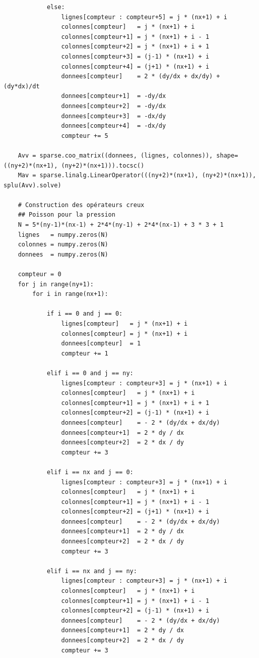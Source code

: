 \begin{verbatim}
            else:
                lignes[compteur : compteur+5] = j * (nx+1) + i
                colonnes[compteur]   = j * (nx+1) + i
                colonnes[compteur+1] = j * (nx+1) + i - 1
                colonnes[compteur+2] = j * (nx+1) + i + 1
                colonnes[compteur+3] = (j-1) * (nx+1) + i
                colonnes[compteur+4] = (j+1) * (nx+1) + i
                donnees[compteur]    = 2 * (dy/dx + dx/dy) + (dy*dx)/dt
                donnees[compteur+1]  = -dy/dx
                donnees[compteur+2]  = -dy/dx
                donnees[compteur+3]  = -dx/dy
                donnees[compteur+4]  = -dx/dy
                compteur += 5

    Avv = sparse.coo_matrix((donnees, (lignes, colonnes)), shape=((ny+2)*(nx+1), (ny+2)*(nx+1))).tocsc()
    Mav = sparse.linalg.LinearOperator(((ny+2)*(nx+1), (ny+2)*(nx+1)), splu(Avv).solve)
    
    # Construction des opérateurs creux
    ## Poisson pour la pression
    N = 5*(ny-1)*(nx-1) + 2*4*(ny-1) + 2*4*(nx-1) + 3 * 3 + 1
    lignes   = numpy.zeros(N)
    colonnes = numpy.zeros(N)
    donnees  = numpy.zeros(N)

    compteur = 0
    for j in range(ny+1):
        for i in range(nx+1):
            
            if i == 0 and j == 0:
                lignes[compteur]   = j * (nx+1) + i
                colonnes[compteur] = j * (nx+1) + i
                donnees[compteur]  = 1
                compteur += 1

            elif i == 0 and j == ny:
                lignes[compteur : compteur+3] = j * (nx+1) + i
                colonnes[compteur]   = j * (nx+1) + i
                colonnes[compteur+1] = j * (nx+1) + i + 1
                colonnes[compteur+2] = (j-1) * (nx+1) + i
                donnees[compteur]    = - 2 * (dy/dx + dx/dy)
                donnees[compteur+1]  = 2 * dy / dx
                donnees[compteur+2]  = 2 * dx / dy
                compteur += 3

            elif i == nx and j == 0:
                lignes[compteur : compteur+3] = j * (nx+1) + i
                colonnes[compteur]   = j * (nx+1) + i
                colonnes[compteur+1] = j * (nx+1) + i - 1
                colonnes[compteur+2] = (j+1) * (nx+1) + i
                donnees[compteur]    = - 2 * (dy/dx + dx/dy)
                donnees[compteur+1]  = 2 * dy / dx
                donnees[compteur+2]  = 2 * dx / dy
                compteur += 3

            elif i == nx and j == ny:
                lignes[compteur : compteur+3] = j * (nx+1) + i
                colonnes[compteur]   = j * (nx+1) + i
                colonnes[compteur+1] = j * (nx+1) + i - 1
                colonnes[compteur+2] = (j-1) * (nx+1) + i
                donnees[compteur]    = - 2 * (dy/dx + dx/dy)
                donnees[compteur+1]  = 2 * dy / dx
                donnees[compteur+2]  = 2 * dx / dy
                compteur += 3
            

\end{verbatim}
